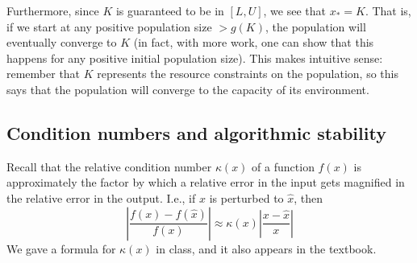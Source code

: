 \documentclass{article}
\begin{document}
\begin{itemize}
\begin{itemize}
        Furthermore, since $K$ is guaranteed to be in $[L, U]$, we see that $x_* = K$. That is, if we start at any positive population size $> g(K)$, the population will eventually converge to $K$ (in fact, with more work, one can show that this happens for any positive initial population size). This makes intuitive sense: remember that $K$ represents the resource constraints on the population, so this says that the population will converge to the capacity of its environment.
    \end{itemize}
\end{itemize}

\newpage
\subsection{Condition numbers and algorithmic stability}
Recall that the relative condition number $\kappa(x)$ of a function $f(x)$ is approximately the factor by which a relative error in the input gets magnified in the relative error in the output. I.e., if $x$ is perturbed to $\hat{x}$, then
\[\left|\frac{f(x)-f(\hat{x})}{f(x)}\right|\approx\kappa(x)\left|\frac{x - \hat{x}}{x}\right|\]
We gave a formula for $\kappa(x)$ in class, and it also appears in the textbook.
\end{document}
